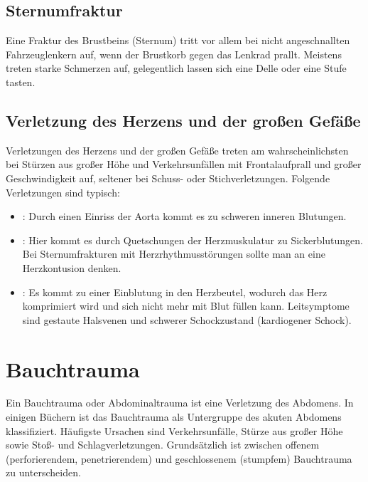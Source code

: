 \subsection{Sternumfraktur}\label{topic:sternumfraktur}
Eine Fraktur des Brustbeins (Sternum) tritt vor allem bei nicht angeschnallten
Fahrzeuglenkern auf, wenn der Brustkorb gegen das Lenkrad prallt. Meistens treten
starke Schmerzen auf, gelegentlich lassen sich eine Delle oder eine Stufe tasten.

\subsection{Verletzung des Herzens und der großen Gefäße}
Verletzungen des Herzens und der großen Gefäße treten am wahrscheinlichsten bei
Stürzen aus großer Höhe und Verkehrsunfällen mit Frontalaufprall und großer
Geschwindigkeit auf, seltener bei Schuss- oder Stichverletzungen. Folgende
Verletzungen sind typisch:

\begin{itemize}
  \item {}: Durch einen Einriss der Aorta kommt es zu schweren inneren Blutungen.
  \item {}: Hier kommt es durch Quetschungen der Herzmuskulatur
  zu Sickerblutungen. Bei Sternumfrakturen mit Herzrhythmusstörungen sollte man
  an eine Herzkontusion denken.
  \item {}: Es kommt zu einer Einblutung in den
  Herzbeutel,  wodurch das Herz komprimiert wird und sich nicht mehr mit Blut
  füllen  kann. Leitsymptome sind gestaute Halsvenen und schwerer Schockzustand
  (kardiogener Schock).
\end{itemize}

\section{Bauchtrauma}

Ein Bauchtrauma oder Abdominaltrauma ist eine Verletzung des Abdomens. In einigen
Büchern ist das Bauchtrauma als Untergruppe des akuten Abdomens klassifiziert.
Häufigste Ursachen sind Verkehrsunfälle, Stürze aus großer Höhe sowie Stoß- und
Schlagverletzungen. \cite{RedelsteinerHRNS1} Grundsätzlich ist zwischen offenem
(perforierendem, penetrierendem) und geschlossenem (stumpfem) Bauchtrauma zu
unterscheiden.

